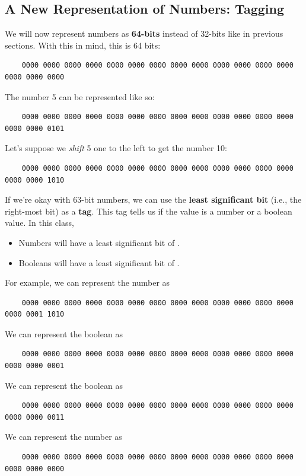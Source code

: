 \subsection{A New Representation of Numbers: Tagging}
We will now represent numbers as \textbf{64-bits} instead of 32-bits like in previous sections. With this in mind, this is 64 bits:
\begin{verbatim}
    0000 0000 0000 0000 0000 0000 0000 0000 0000 0000 0000 0000 0000 0000 0000 0000\end{verbatim}
The number 5 can be represented like so: 
\begin{verbatim}
    0000 0000 0000 0000 0000 0000 0000 0000 0000 0000 0000 0000 0000 0000 0000 0101\end{verbatim}

Let's suppose we \emph{shift} 5 one to the left to get the number 10: 
\begin{verbatim}
    0000 0000 0000 0000 0000 0000 0000 0000 0000 0000 0000 0000 0000 0000 0000 1010\end{verbatim}

If we're okay with 63-bit numbers, we can use the \textbf{least significant bit} (i.e., the right-most bit) as a \textbf{tag}. This tag tells us if the value is a number or a boolean value. In this class, 
\begin{itemize}
    \item Numbers will have a least significant bit of .
    \item Booleans will have a least significant bit of . 
\end{itemize}
For example, we can represent the number  as 
\begin{verbatim}
    0000 0000 0000 0000 0000 0000 0000 0000 0000 0000 0000 0000 0000 0000 0001 1010\end{verbatim}
We can represent the boolean  as 
\begin{verbatim}
    0000 0000 0000 0000 0000 0000 0000 0000 0000 0000 0000 0000 0000 0000 0000 0001\end{verbatim}
We can represent the boolean  as 
\begin{verbatim}
    0000 0000 0000 0000 0000 0000 0000 0000 0000 0000 0000 0000 0000 0000 0000 0011\end{verbatim}
We can represent the number  as 
\begin{verbatim}
    0000 0000 0000 0000 0000 0000 0000 0000 0000 0000 0000 0000 0000 0000 0000 0000\end{verbatim}
    
